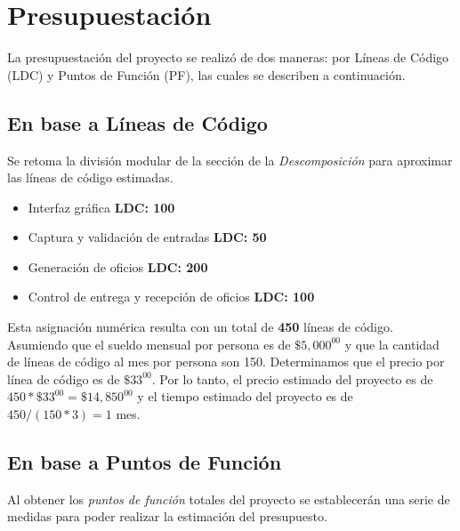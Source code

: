 \documentclass[letterpaper]{article}
\begin{document}
\section{Presupuestación}
La presupuestación del proyecto se realizó de dos maneras: por Líneas de Código (LDC) y Puntos de Función (PF), las cuales se describen a continuación.

\subsection{En base a Líneas de Código}
Se retoma la división modular de la sección de la \emph{Descomposición} para aproximar las líneas de código estimadas.

\begin{itemize}
\item Interfaz gráfica \textbf{LDC: 100}
\item Captura y validación de entradas \textbf{LDC: 50}
\item Generación de oficios \textbf{LDC: 200}
\item Control de entrega y recepción de oficios \textbf{LDC: 100}
\end{itemize}

Esta asignación numérica resulta con un total de \textbf{450} líneas de código. Asumiendo que el sueldo mensual por persona es de $\$5,000^{00}$ y que la cantidad de líneas de código al mes por persona son 150. Determinamos que el precio por línea de código es de $\$33^{00}$. Por lo tanto, el precio estimado del proyecto es de $450 * \$33^{00} = \$14,850^{00}$ y el tiempo estimado del proyecto es de $450/(150*3)=1$ mes.

\subsection{En base a Puntos de Función}
Al obtener los \emph{puntos de función} totales del proyecto se establecerán una serie de medidas para poder realizar la estimación del presupuesto.
\end{document}
